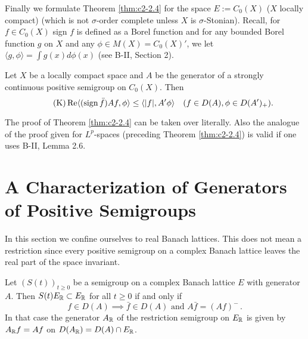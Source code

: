 Finally we formulate Theorem \ref{thm:c2-2.4}   for the space $E := C_{0}(X)$ ($X$ locally compact) (which is not $\sigma$-order complete unless $X$ is $\sigma$-Stonian).
Recall, for $f \in C_{0}(X)$ sign $f$ is defined as a Borel function and for any bounded Borel function $g$ on $X$ and any $\phi \in M(X) = C_{0}(X)'$, we let $\langle g,\phi \rangle = \int g(x) d\phi(x)$ (see B-II, Section 2).

\begin{theorem}\label{thm:c2-2.6}
Let $X$ be a locally compact space and $A$ be the generator of a strongly continuous positive semigroup on $C_{0}(X)$.
Then
\begin{equation*}\label{eq:c2-K-3} \tag{K}
\mathop{}\!\mathrm{Re}\langle(\operatorname{sign} \bar{f})Af,\phi \rangle \leq \langle |f|,A'\phi \rangle \quad (f \in D(A), \phi \in D(A')_{+}).
\end{equation*}
\end{theorem}

The proof of Theorem \ref{thm:c2-2.4} can be taken over literally.
Also the analogue of the proof given for $L^p$-spaces (preceding Theorem \ref{thm:c2-2.4})  is valid if one uses B-II, Lemma 2.6.



\section{A Characterization of Generators of Positive Semigroups}\label{sec:c2-3}

In this section we confine ourselves to real Banach lattices.
This does not mean a restriction since every positive semigroup on a complex Banach lattice leaves the real part of the space invariant.
\begin{remark}\label{rem:c2-3.1}
Let $(S(t))_{t \geq 0}$ be a semigroup on a complex Banach lattice $E$ with generator $A$.
Then $S(t)E_{\mathbb{R}} \subset E_{\mathbb{R}}$ for all $t \geq 0$ if and only if
\begin{equation}\label{eq:c2-3.1}
f \in D(A) \implies \bar{f} \in D(A) \text{ and } A\bar{f} = (Af)^{-} \,.
\end{equation}
In that case the generator $A_{\mathbb{R}}$ of the restriction semigroup on $E_{\mathbb{R}}$ is given by $A_{\mathbb{R}}f = Af$ on $D(A_{\mathbb{R}}) = D(A) \cap E_{\mathbb{R}}$.
\end{remark}

